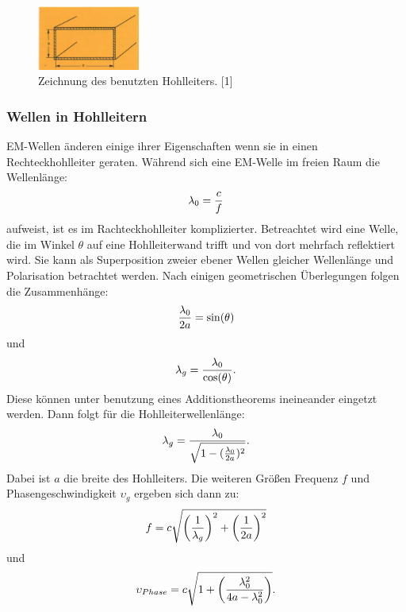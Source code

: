\begin{figure}
    \centering
    \includegraphics[width=0.3\textwidth,angle=0]{content/grafiken/Hohlleiter.PNG}
    \caption{Zeichnung des benutzten Hohlleiters. [1]}
    \label{fig:Hohlleiter}
  \end{figure}

\subsubsection{Wellen in Hohlleitern}
EM-Wellen änderen einige ihrer Eigenschaften wenn sie in einen Rechteckhohlleiter geraten. Während sich eine 
EM-Welle im freien Raum die Wellenlänge:
\begin{equation}
    \lambda_0=\frac{c}{f}\\
\end{equation}
aufweist, ist es im Rachteckhohlleiter komplizierter. Betreachtet wird eine Welle, die im Winkel $\theta$ auf 
eine Hohlleiterwand trifft und von dort mehrfach reflektiert wird. Sie kann als Superposition zweier ebener 
Wellen gleicher Wellenlänge und Polarisation betrachtet werden. Nach einigen geometrischen Überlegungen
folgen die Zusammenhänge:
\begin{equation}
    \frac{\lambda_0}{2a}=\sin(\theta)\\
\end{equation}
und
\begin{equation}
    \lambda_g=\frac{\lambda_0}{\cos(\theta)}.\\
\end{equation}
Diese können unter benutzung eines Additionstheorems ineineander eingetzt werden. Dann folgt für die Hohlleiterwellenlänge:
\begin{equation}
    \lambda_g=\frac{\lambda_0}{\sqrt{1-(\frac{\lambda_0}{2a})^2}}.\\
\end{equation}
Dabei ist $a$ die breite des Hohlleiters. Die weiteren Größen Frequenz $f$ und Phasengeschwindigkeit $\upsilon_g$ 
ergeben sich dann zu:
\begin{equation}
    f=c\sqrt{\left(\frac{1}{\lambda_g}\right)^2+\left(\frac{1}{2a}\right)^2}\\
\end{equation}
und 
\begin{equation}
    \upsilon_{Phase}=c\sqrt{1+\left(\frac{\lambda_0^2}{4a-\lambda_0^2}\right)}.\\
\end{equation}
